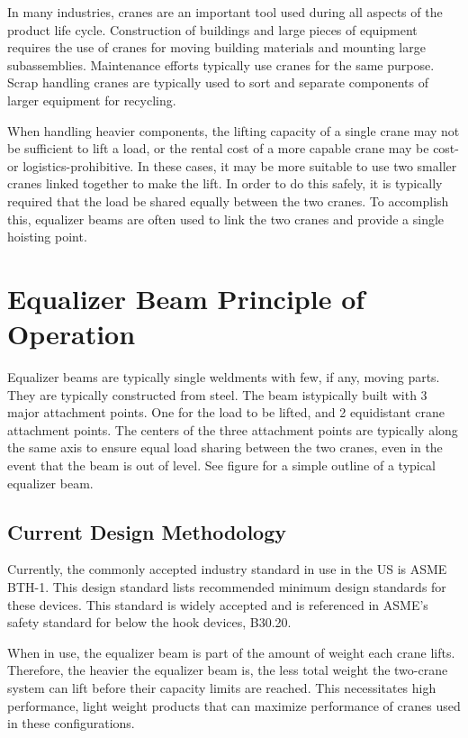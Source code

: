 In many industries, cranes are an important tool used during all aspects of the product life cycle. Construction of buildings and large pieces of equipment requires the use of cranes for moving building materials and mounting large subassemblies. Maintenance efforts typically use cranes for the same purpose. Scrap handling cranes are typically used to sort and separate components of larger equipment for recycling.

When handling heavier components, the lifting capacity of a single crane may not be sufficient to lift a load, or the rental cost of a more capable crane may be cost- or logistics-prohibitive. In these cases, it may be more suitable to use two smaller cranes linked together to make the lift. In order to do this safely, it is typically required that the load be shared equally between the two cranes. To accomplish this, equalizer beams are often used to link the two cranes and provide a single hoisting point.

\section{Equalizer Beam Principle of Operation} 

Equalizer beams are typically single weldments with few, if any, moving parts. They are typically constructed from steel. The beam istypically built with 3 major attachment points. One for the load to be lifted, and 2 equidistant crane attachment points. The centers of the three attachment points are typically along the same axis to ensure equal load sharing between the two cranes, even in the event that the beam is out of level. See figure  for a simple outline of a typical equalizer beam.

\subsection{Current Design Methodology}

Currently, the commonly accepted industry standard in use in the US is ASME BTH-1. This design standard lists recommended minimum design standards for these devices. This standard is widely accepted and is referenced in ASME's safety standard for below the hook devices, B30.20.

When in use, the equalizer beam is part of the amount of weight each crane lifts. Therefore, the heavier the equalizer beam is, the less total weight the two-crane system can lift before their capacity limits are reached. This necessitates high performance, light weight products that can maximize performance of cranes used in these configurations. 

